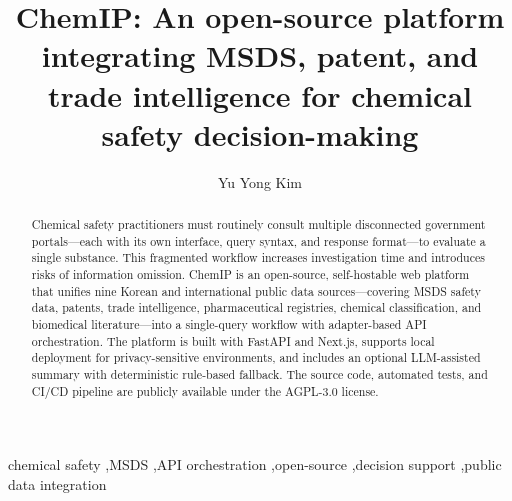 \documentclass[preprint,12pt]{elsarticle}
\begin{document}
\begin{frontmatter}

\title{ChemIP: An open-source platform integrating MSDS, patent, and trade intelligence for chemical safety decision-making}

\author[inst1]{Yu Yong Kim}


\begin{abstract}
Chemical safety practitioners must routinely consult multiple disconnected government portals---each with its own interface, query syntax, and response format---to evaluate a single substance.
This fragmented workflow increases investigation time and introduces risks of information omission.
ChemIP is an open-source, self-hostable web platform that unifies nine Korean and international public data sources---covering MSDS safety data, patents, trade intelligence, pharmaceutical registries, chemical classification, and biomedical literature---into a single-query workflow with adapter-based API orchestration.
The platform is built with FastAPI and Next.js, supports local deployment for privacy-sensitive environments, and includes an optional LLM-assisted summary with deterministic rule-based fallback.
The source code, automated tests, and CI/CD pipeline are publicly available under the AGPL-3.0 license.
\end{abstract}

\begin{keyword}
chemical safety \sep MSDS \sep API orchestration \sep open-source \sep decision support \sep public data integration
\end{keyword}

\end{frontmatter}

\end{document}
